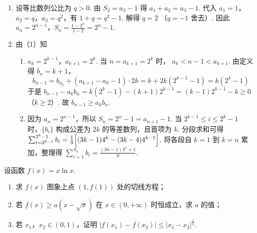 \begin{solution}
\begin{enumerate}
    \item 设等比数列公比为 \(q>0\). 由
\(S_2=a_3-1\)
得
\(a_1+a_2=a_3-1\).
代入 \(a_1=1\)，\(a_2=q\)，\(a_3=q^2\)，有
\(1+q=q^2-1\).
解得
\(q=2\)
（\(q=-1\) 舍去）.
因此
\(a_n=2^{n-1}\)，\(S_n=\frac{1-2^n}{1-2}=2^n-1\).

    \item 由（1）知
    \begin{enumerate}
        \item \(a_k=2^{k-1}\)，\(a_{k+1}=2^k\).
当 \(n=a_{k+1}=2^k\) 时，
\(a_k<n-1<a_{k+1}\).
由定义得
\(b_n=k+1\)，
\[
b_{n-1}=b_{a_k}+(a_{k+1}-a_k-1)\cdot 2k =k+2k(2^{k-1}-1) =k(2^k-1)
\]
于是
\(b_{n-1}-a_k b_n =k(2^k-1)-(k+1)2^{k-1} =(k-1)2^{k-1}-k\ge 0\)（\(k\ge 2\)）.
故
\(b_{n-1}\ge a_k b_n\).

        \item 因为 \(a_n=2^{n-1}\)，所以
\(S_n=2^n-1=a_{n+1}-1\).
当
\(2^{k-1}\le i\le 2^k-1\)
时，\(\{b_i\}\) 构成公差为 \(2k\) 的等差数列，且首项为 \(k\). 分段求和可得
\(\sum_{i=2^{k-1}}^{2^k-1} b_i =\frac19\Bigl[(3k-1)4^k-(3k-4)4^{k-1}\Bigr]\).
将各段自 \(k=1\) 到 \(k=n\) 累加，整理得
\(\sum_{i=1}^{S_n}b_i=\frac{(3n-1)4^n+1}{9}\).
    \end{enumerate}
\end{enumerate}
\end{solution}

\begin{problem}
设函数 \(f(x)=x\ln x\).
\begin{enumerate}
    \item 求 \(f(x)\) 图象上点 \((1,f(1))\) 处的切线方程；
    \item 若 \(f(x)\ge a(x-\sqrt{x})\) 在 \(x\in(0,+\infty)\) 时恒成立，求 \(a\) 的值；
    \item 若 \(x_1\)，\(x_2\in(0,1)\)，证明 \(|f(x_1)-f(x_2)|\le |x_1-x_2|^{\frac{1}{2}}\).
\end{enumerate}
\end{problem}

